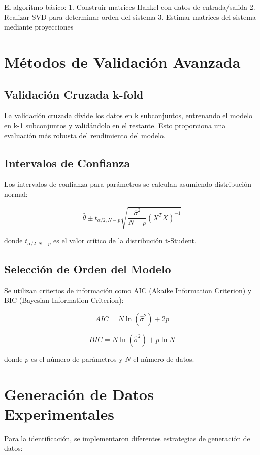 \documentclass[a4paper,openright,9pt]{report}
\begin{document}
El algoritmo básico:
1. Construir matrices Hankel con datos de entrada/salida
2. Realizar SVD para determinar orden del sistema
3. Estimar matrices del sistema mediante proyecciones

\section{Métodos de Validación Avanzada}

\subsection{Validación Cruzada k-fold}

La validación cruzada divide los datos en k subconjuntos, entrenando el modelo en k-1 subconjuntos y validándolo en el restante. Esto proporciona una evaluación más robusta del rendimiento del modelo.

\subsection{Intervalos de Confianza}

Los intervalos de confianza para parámetros se calculan asumiendo distribución normal:

\[
\hat{\theta} \pm t_{\alpha/2, N-p} \sqrt{\frac{\hat{\sigma}^2}{N-p} (X^T X)^{-1}}
\]

donde $t_{\alpha/2, N-p}$ es el valor crítico de la distribución t-Student.

\subsection{Selección de Orden del Modelo}

Se utilizan criterios de información como AIC (Akaike Information Criterion) y BIC (Bayesian Information Criterion):

\[
AIC = N \ln(\hat{\sigma}^2) + 2p
\]

\[
BIC = N \ln(\hat{\sigma}^2) + p \ln N
\]

donde $p$ es el número de parámetros y $N$ el número de datos.

\section{Generación de Datos Experimentales}

Para la identificación, se implementaron diferentes estrategias de generación de datos:
\end{document}
